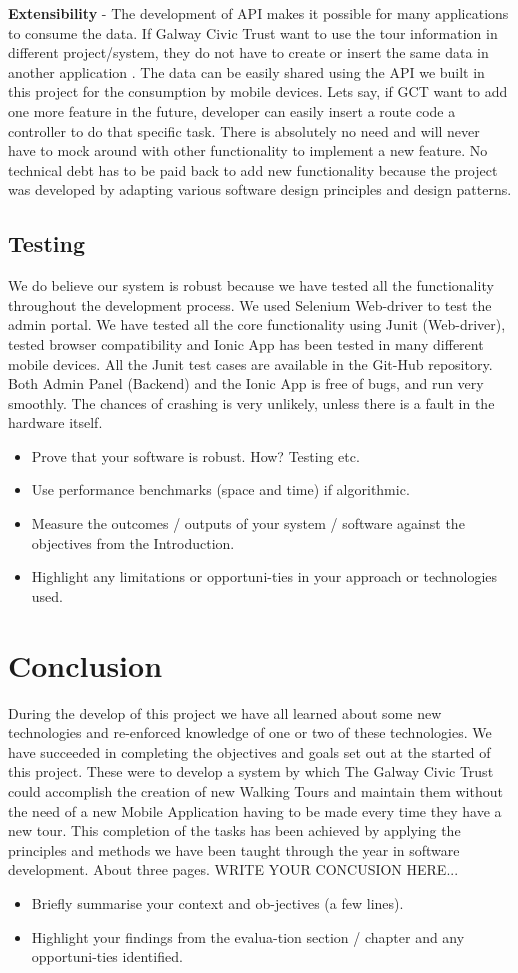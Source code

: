     \textbf{Extensibility} - The development of API makes it possible for many applications to consume the data. If Galway Civic Trust want to use the tour information in different project/system, they do not have to create or insert the same data in another application . The data can be easily shared using the API we built in this project for the consumption by mobile devices.
    Lets say, if GCT want to add one more feature in the future, developer can easily insert a route code a controller to do that specific task. There is absolutely no need and will never have to mock around with other functionality to implement a new feature. No technical debt has to be paid back to add new functionality because the project was developed by adapting various software design principles and design patterns. 
    
	\section{Testing}
	We do believe our system is robust because we have tested all the functionality throughout the development process. We used Selenium Web-driver to test the admin portal. We have tested all the core functionality using Junit (Web-driver), tested browser compatibility and Ionic App has been tested in many different mobile devices. All the Junit test cases are available in the Git-Hub repository. Both Admin Panel (Backend)  and the Ionic App is free of bugs, and run very smoothly.  The chances of crashing is very unlikely, unless there is a fault in the hardware itself.  
	
	
\begin{itemize}
	\item Prove that your software is robust. How? Testing etc. 
	\item Use performance benchmarks (space and time) if algorithmic.
	\item Measure the outcomes / outputs of your system / software against the objectives from the Introduction.
	\item Highlight any limitations or opportuni-ties in your approach or technologies used.
\end{itemize}

\chapter{Conclusion}
During the develop of this project we have all learned about some new technologies and re-enforced knowledge of one or two of these technologies. We have succeeded in completing the objectives and goals set out at the started of this project. These were to develop a system by which The Galway Civic Trust could accomplish the creation of new Walking Tours and maintain them without the need of a new Mobile Application having to be made every time they have a new tour. This completion of the tasks has been achieved by applying the principles and methods we have been taught through the year in software development. 
About three pages. WRITE YOUR CONCUSION HERE...

\begin{itemize}
	\item Briefly summarise your context and ob-jectives (a few lines).
	\item Highlight your findings from the evalua-tion section / chapter and any opportuni-ties identified.
\end{itemize}
